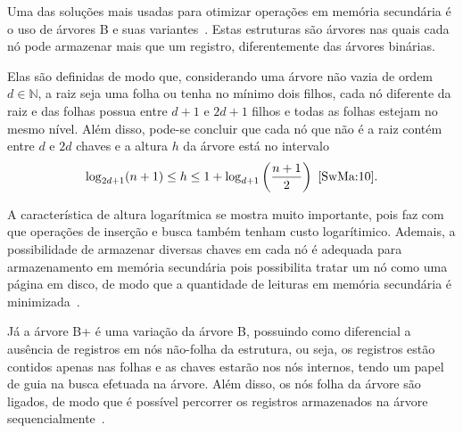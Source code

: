 \documentclass[12pt]{article}
\begin{document}
Uma das soluções mais usadas para otimizar operações em memória secundária é o
uso de árvores B e suas variantes~\cite{Co:79}. Estas estruturas são árvores
nas quais cada nó pode armazenar mais que um registro, diferentemente das
árvores binárias.

Elas são definidas de modo que, considerando uma árvore não vazia de ordem
$d \in \mathbb{N}$, a raiz seja uma folha ou tenha no mínimo dois filhos, cada
nó diferente da raiz e das folhas possua entre $d+1$ e $2d +1$ filhos e todas as
folhas estejam no mesmo nível.
Além disso, pode-se concluir que cada nó que não é a raiz contém entre $d$ e $2d$
chaves e a altura $h$ da árvore está no intervalo
\[ \log_{2d+1} (n+1) \leq h \leq 1 + \log_{d+1} \left(\frac{n + 1}{2}\right)~\cite{SwMa:10}. \]

A característica de altura logarítmica se mostra muito importante, pois faz com
que operações de inserção e busca também tenham custo logarítimico.
Ademais, a possibilidade de armazenar diversas chaves em cada nó é adequada para
armazenamento em memória secundária pois possibilita tratar um nó como uma página %
em disco, de modo que a quantidade de leituras em memória secundária é minimizada~\cite{Kn:98}.



Já a árvore B+ é uma variação da árvore B, possuindo como
diferencial a ausência de registros em nós não-folha da estrutura, ou seja,
os registros estão contidos apenas nas folhas e as chaves estarão nos nós internos,
tendo um papel de guia na busca efetuada na árvore.
Além disso, os nós folha da árvore são ligados, de modo que é possível percorrer
os registros armazenados na árvore sequencialmente~\cite{Pm:10}.
\end{document}
